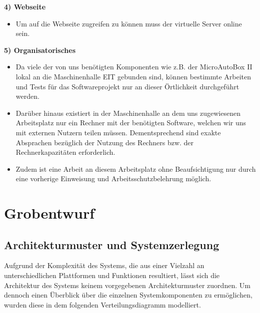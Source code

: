 \documentclass[fontsize = 12pt, paper = a4]{scrreprt}
\begin{document}
\textbf{4) Webseite}

\begin{itemize}

\item Um auf die Webseite zugreifen zu können muss der virtuelle Server online sein.

\end{itemize}

\textbf{5) Organisatorisches}

\begin{itemize}

\item Da viele der von uns benötigten Komponenten wie z.B. der MicroAutoBox II lokal an die Maschinenhalle EIT gebunden sind, können bestimmte Arbeiten und Tests für das Softwareprojekt nur an dieser Örtlichkeit durchgeführt werden.

\item Darüber hinaus existiert in der Maschinenhalle an dem uns zugewiesenen Arbeitsplatz nur ein Rechner mit der benötigten Software, welchen wir uns mit externen Nutzern teilen müssen. Dementsprechend sind exakte Absprachen bezüglich der Nutzung des Rechners bzw. der Rechnerkapazitäten erforderlich.

\item Zudem ist eine Arbeit an diesem Arbeitsplatz ohne Beaufsichtigung nur durch eine vorherige Einweisung und Arbeitsschutzbelehrung möglich.

\end{itemize}


\chapter{Grobentwurf}

\section{Architekturmuster und Systemzerlegung}

Aufgrund der Komplexität des Systems, die aus einer Vielzahl an unterschiedlichen Plattformen und Funktionen resultiert, lässt sich die Architektur des Systems keinem vorgegebenen Architekturmuster zuordnen. Um dennoch einen Überblick über die einzelnen Systemkomponenten zu ermöglichen, wurden diese in dem folgenden Verteilungsdiagramm modelliert.
\end{document}
